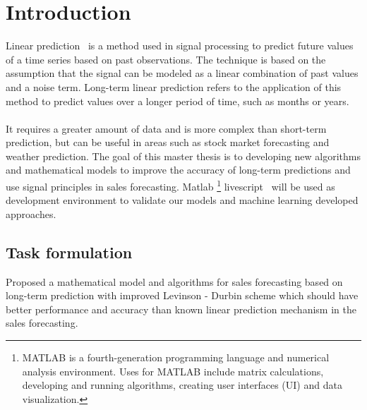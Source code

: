 
{}

\chapter*{Introduction}

Linear prediction~\cite{Vaidyanathan} is a method used in signal processing to predict future values of a time series
based on past observations. The technique is based on the assumption that the signal can be modeled as a linear
combination of past values and a noise term. Long-term linear prediction refers to the application of this method
to predict values over a longer period of time, such as months or years.\\
\\
It requires a greater amount of data and is more complex than short-term prediction, but can be useful in areas
such as stock market forecasting and weather prediction. The goal of this master thesis is to developing new
algorithms and mathematical models to improve the accuracy of long-term predictions and use signal principles
in sales forecasting. Matlab \footnote{MATLAB is a fourth-generation programming language and numerical analysis
environment. Uses for MATLAB include matrix calculations, developing and running algorithms, creating user interfaces (UI)
and data visualization.} livescript~\cite{livescript} will be used as development environment to validate our
models and machine learning developed approaches.

\section*{Task formulation}

Proposed a mathematical model and algorithms for sales forecasting based on long-term prediction with improved
Levinson - Durbin scheme which should have better performance and accuracy than known linear prediction
mechanism in the sales forecasting.
